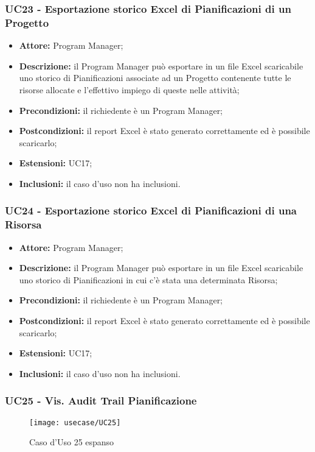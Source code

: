 \subsubsection*{UC23 - Esportazione storico Excel di Pianificazioni di un Progetto}
\begin{itemize}[label=$\circ$]
\item \textbf{Attore:} Program Manager;
\item \textbf{Descrizione:} il Program Manager può esportare in un file Excel scaricabile uno storico di Pianificazioni associate ad un Progetto contenente tutte le risorse allocate e l’effettivo impiego di queste nelle attività;
\item \textbf{Precondizioni:} il richiedente è un Program Manager;
\item \textbf{Postcondizioni:} il report Excel è stato generato correttamente ed è possibile
scaricarlo;
\item \textbf{Estensioni:} UC17;
\item \textbf{Inclusioni:} il caso d'uso non ha inclusioni.
\end{itemize}

\subsubsection*{UC24 - Esportazione storico Excel di Pianificazioni di una Risorsa}
\begin{itemize}[label=$\circ$]
\item \textbf{Attore:} Program Manager;
\item \textbf{Descrizione:} il Program Manager può esportare in un file Excel scaricabile uno storico di Pianificazioni in cui c'è stata una determinata Risorsa;
\item \textbf{Precondizioni:} il richiedente è un Program Manager;
\item \textbf{Postcondizioni:} il report Excel è stato generato correttamente ed è possibile
scaricarlo;
\item \textbf{Estensioni:} UC17;
\item \textbf{Inclusioni:} il caso d'uso non ha inclusioni.
\end{itemize}

\subsubsection*{UC25 - Vis. Audit Trail Pianificazione}
\begin{figure}[H] 
    \texttt{[image: usecase/UC25]} 
    \caption{Caso d'Uso 25 espanso}
\end{figure}

